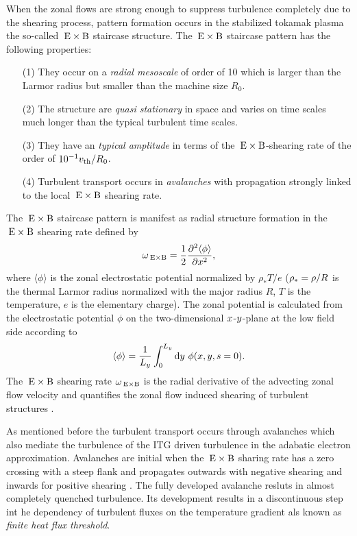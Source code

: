 When the zonal flows are strong enough to suppress turbulence completely due to the shearing process, pattern formation occurs in the stabilized tokamak plasma the so-called $\mathrm{\:E}\times\mathrm{B}$ staircase structure. The $\mathrm{\:E}\times\mathrm{B}$ staircase pattern has the following properties:
\begin{enumerate}
	\item[(1)] They occur on a \textit{radial mesoscale} of order of 10 \rhoth which is larger than the Larmor radius but smaller than the machine size $R_0$.
	\item[(2)] The structure are \textit{quasi stationary} in space and varies on time scales much longer than the typical turbulent time scales.
	\item[(3)] They have an \textit{typical amplitude} in terms of the $\mathrm{\:E}\times\mathrm{B}$-shearing rate of the order of $10^{-1} v_{\mathrm{th}}/R_0$.
	\item[(4)] Turbulent transport occurs in \textit{avalanches} with propagation strongly linked to the local $\mathrm{\:E}\times\mathrm{B}$ shearing rate. \cite{McMillan2009}
\end{enumerate} \bigskip

The $\mathrm{\:E}\times\mathrm{B}$ staircase pattern is manifest as radial structure formation in the $\mathrm{\:E}\times\mathrm{B}$ shearing rate defined by\cite{Rath2016, Pueschel2008, Peeters2016}
\begin{equation}
	\omega_{\mathrm{\:E \times B}} = \frac{1}{2} \frac{\partial^2 \langle \phi \rangle}{\partial x^2},
	\label{eq:shearingrate}
\end{equation}
where $\langle \phi \rangle$ is the zonal electrostatic potential normalized by $\rho_\ast T/e$ ($\rho_\ast = \rho/R$ is the thermal Larmor radius normalized with the major radius $R$, $T$ is the temperature, $e$ is the elementary charge).
The zonal potential is calculated from the electrostatic potential $\phi$ on the two-dimensional $x$-$y$-plane at the low field side according to\cite{Rath2021}
\begin{equation}
\langle \phi \rangle = \frac{1}{L_y} \int_0^{L_y} \mathrm{d}y ~ \phi(x,y,s=0).
\end{equation}
The $\mathrm{\:E}\times\mathrm{B}$ shearing rate $\omega_{\mathrm{\:E \times B}}$ is the radial derivative of the advecting zonal flow velocity \cite{Hahm1995, Waltz1998} and quantifies the zonal flow induced shearing of turbulent structures \cite{Biglari1990, Hahm1995, Burnell1997}. \\ \bigskip

As mentioned before the turbulent transport occurs through avalanches which also mediate the turbulence of the ITG driven turbulence in the adabatic electron approximation. Avalanches are initial when the $\mathrm{\:E}\times\mathrm{B}$ sharing rate has a zero crossing with a steep flank and propagates outwards with negative shearing and inwards for positive shearing \cite{Idomura2009,McMillan2009}. The fully developed avalanche resluts in almost completely quenched turbulence. Its development results in a discontinuous step int he dependency of turbulent fluxes on the temperature gradient als known as \textit{finite heat flux threshold}. \cite{Peeters2016,Weikl2017}